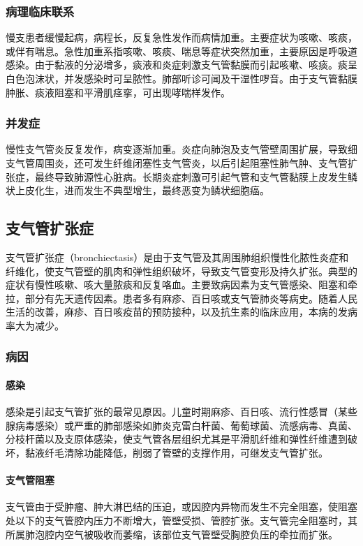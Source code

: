 \subsubsection{病理临床联系}

慢支患者缓慢起病，病程长，反复急性发作而病情加重。主要症状为咳嗽、咳痰，或伴有喘息。急性加重系指咳嗽、咳痰、喘息等症状突然加重，主要原因是呼吸道感染。由于黏液的分泌增多，痰液和炎症刺激支气管黏膜而引起咳嗽、咳痰。痰呈白色泡沫状，并发感染时可呈脓性。肺部听诊可闻及干湿性啰音。由于支气管黏膜肿胀、痰液阻塞和平滑肌痉挛，可出现哮喘样发作。

\subsubsection{并发症}

慢性支气管炎反复发作，病变逐渐加重。炎症向肺泡及支气管壁周围扩展，导致细支气管周围炎，还可发生纤维闭塞性支气管炎，以后引起阻塞性肺气肿、支气管扩张症，最终导致肺源性心脏病。长期炎症刺激可引起气管和支气管黏膜上皮发生鳞状上皮化生，进而发生不典型增生，最终恶变为鳞状细胞癌。

\subsection{支气管扩张症}

支气管扩张症（bronchiectasis）是由于支气管及其周围肺组织慢性化脓性炎症和纤维化，使支气管壁的肌肉和弹性组织破坏，导致支气管变形及持久扩张。典型的症状有慢性咳嗽、咳大量脓痰和反复咯血。主要致病因素为支气管感染、阻塞和牵拉，部分有先天遗传因素。患者多有麻疹、百日咳或支气管肺炎等病史。随着人民生活的改善，麻疹、百日咳疫苗的预防接种，以及抗生素的临床应用，本病的发病率大为减少。

\subsubsection{病因}

\paragraph{感染}
感染是引起支气管扩张的最常见原因。儿童时期麻疹、百日咳、流行性感冒（某些腺病毒感染）或严重的肺部感染如肺炎克雷白杆菌、葡萄球菌、流感病毒、真菌、分枝杆菌以及支原体感染，使支气管各层组织尤其是平滑肌纤维和弹性纤维遭到破坏，黏液纤毛清除功能降低，削弱了管壁的支撑作用，可继发支气管扩张。

\paragraph{支气管阻塞}
支气管由于受肿瘤、肿大淋巴结的压迫，或因腔内异物而发生不完全阻塞，使阻塞处以下的支气管腔内压力不断增大，管壁受损、管腔扩张。支气管完全阻塞时，其所属肺泡腔内空气被吸收而萎缩，该部位支气管壁受胸腔负压的牵拉而扩张。

